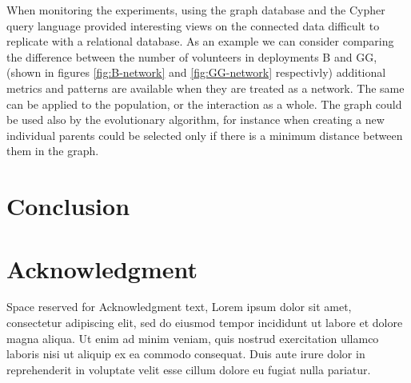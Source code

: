 \documentclass[conference]{IEEEtran}
\begin{document}
When monitoring the experiments, using the graph database and the Cypher query language 
provided interesting views on the connected data difficult to replicate with a relational database. 
As an example we can consider comparing the difference between the number of volunteers in deployments
B and GG,(shown in figures \ref{fig:B-network} and \ref{fig:GG-network} respectivly) additional
metrics and patterns are available when they are treated as a network. The same can be applied to 
the population, or the interaction as a whole. The graph could be used also by the evolutionary
algorithm, for instance when creating a new individual 
parents could be selected only if there is a minimum distance between them in the graph.

\section{Conclusion}
\label{sec:conclusions}


\section*{Acknowledgment}
Space reserved for Acknowledgment text, Lorem ipsum dolor sit amet, consectetur adipiscing elit,
sed do eiusmod tempor incididunt ut labore et dolore magna aliqua. Ut enim ad minim veniam, quis 
nostrud exercitation ullamco laboris nisi ut aliquip ex ea commodo consequat. Duis aute irure dolor
in reprehenderit in voluptate velit esse cillum dolore eu fugiat nulla pariatur. 







%
%
%


\end{document}
